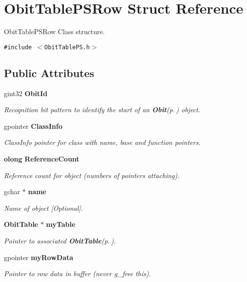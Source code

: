 \section{Obit\-Table\-PSRow Struct Reference}
\label{structObitTablePSRow}
Obit\-Table\-PSRow Class structure.  


{\tt \#include $<$Obit\-Table\-PS.h$>$}

\subsection*{Public Attributes}
\begin{CompactItemize}
\item 
gint32 {\bf Obit\-Id}
\begin{CompactList}\small\item\em Recognition bit pattern to identify the start of an {\bf Obit}{\rm (p.\,\pageref{structObit})} object. \item\end{CompactList}\item 
gpointer {\bf Class\-Info}
\begin{CompactList}\small\item\em Class\-Info pointer for class with name, base and function pointers. \item\end{CompactList}\item 
{\bf olong} {\bf Reference\-Count}
\begin{CompactList}\small\item\em Reference count for object (numbers of pointers attaching). \item\end{CompactList}\item 
gchar $\ast$ {\bf name}
\begin{CompactList}\small\item\em Name of object [Optional]. \item\end{CompactList}\item 
{\bf Obit\-Table} $\ast$ {\bf my\-Table}
\begin{CompactList}\small\item\em Pointer to associated {\bf Obit\-Table}{\rm (p.\,\pageref{structObitTable})}. \item\end{CompactList}\item 
gpointer {\bf my\-Row\-Data}
\begin{CompactList}\small\item\em Pointer to row data in buffer (never g\_\-free this). \item\end{CompactList}\item 

\end{CompactItemize}
